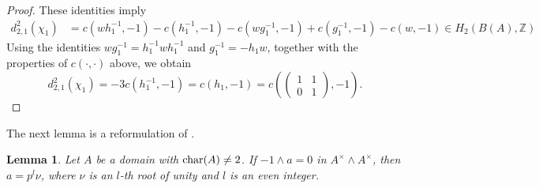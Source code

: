 \documentclass[11pt]{amsart}
\theoremstyle{definition}
\theoremstyle{plain}
\newtheorem{lem}[ntn]{Lemma}
\numberwithin{equation}{section}
\newcommand{\z}{\mathbb{Z}}
\newcommand{\GG}{\mathcal{G}}
\renewcommand{\SS}{\mathcal{S}}
\renewcommand{\aa}{{A^\times}}
\newcommand{\lan}{\langle}
\newcommand{\ran}{\rangle}
\renewcommand{\char}{{\rm char}}
\newcommand{\mtxx}[4]
{\left(\!\!
\begin{array}{cc}
\!\!#1 & \!\!#2\\
\!\!#3 & \!\!#4
\end{array}\!\!
\right)}
\begin{document}
\begin{proof}
These identities imply
\begin{align*}
	d^2_{2,1}(\chi_1)&=c(wh_1^{-1},-1)-c(h_1^{-1},-1)-c(wg_1^{-1},-1)+c(g_1^{-1},-1)-c(w,-1)\in H_2(B(A),\z)
\end{align*}
Using the identities $wg_1^{-1}=h_1^{-1}wh_1^{-1}$ and $g_1^{-1}=-h_1w$, together with the properties of $c(\cdot,\cdot)$ above, we obtain
\[
d^2_{2,1}(\chi_1)=-3c(h^{-1}_1,-1)=c(h_1,-1)=c\left(\mtxx{1}{1}{0}{1},-1\right).
\]
\end{proof}
The next lemma is a reformulation of \cite[Lemma 4.5]{B-E--2023}.
\begin{lem}\label{ker-d-alpha}
    Let $A$ be a domain with $\char(A)\neq 2$. If $-1\wedge a=0$ in $\aa\wedge\aa$, then $a=p^l\nu$, where $\nu$ is an $l$-th root of unity and $l$ is an even integer.
\end{lem}
\end{document}
